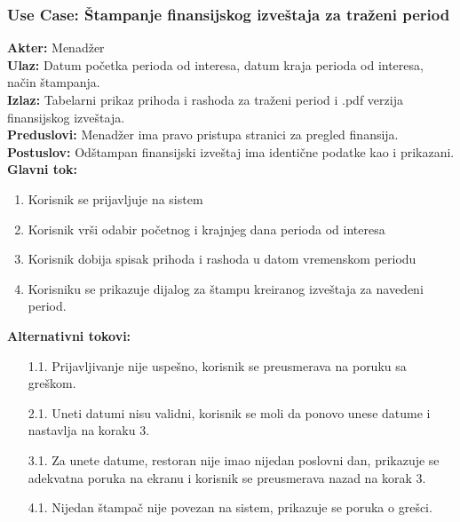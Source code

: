 \documentclass{article}
\begin{document}
		
\subsubsection{\textbf{Use Case}: Štampanje finansijskog izveštaja za traženi period}
\textbf{Akter:} Menadžer\\
\textbf{Ulaz:} Datum početka perioda od interesa, datum kraja perioda od interesa, način štampanja.\\
\textbf{Izlaz:} Tabelarni prikaz prihoda i rashoda za traženi period i .pdf verzija finansijskog izveštaja.\\
\textbf{Preduslovi:} Menadžer ima pravo pristupa stranici za pregled finansija.\\
\textbf{Postuslov:} Odštampan finansijski izveštaj ima identične podatke kao i prikazani.\\
\textbf{Glavni tok:}
\begin{enumerate}
\item Korisnik se prijavljuje na sistem
\item Korisnik vrši odabir početnog i krajnjeg dana perioda od interesa
\item Korisnik dobija spisak prihoda i rashoda u datom vremenskom periodu
\item Korisniku se prikazuje dijalog za štampu kreiranog izveštaja za navedeni period.
\end{enumerate}
\textbf{Alternativni tokovi:}\\
\begin{itemize}
\item [1.1.] Prijavljivanje nije uspešno, korisnik se preusmerava na poruku sa greškom.
\item [2.1.]  Uneti datumi nisu validni, korisnik se moli da ponovo unese datume i nastavlja na koraku 3.
\item [3.1.]  Za unete datume, restoran nije imao nijedan poslovni dan, prikazuje se adekvatna poruka na ekranu i korisnik se preusmerava nazad na korak 3.
\item [4.1.]  Nijedan štampač nije povezan na sistem, prikazuje se poruka o grešci.
\end{itemize}
       
\end{document}
